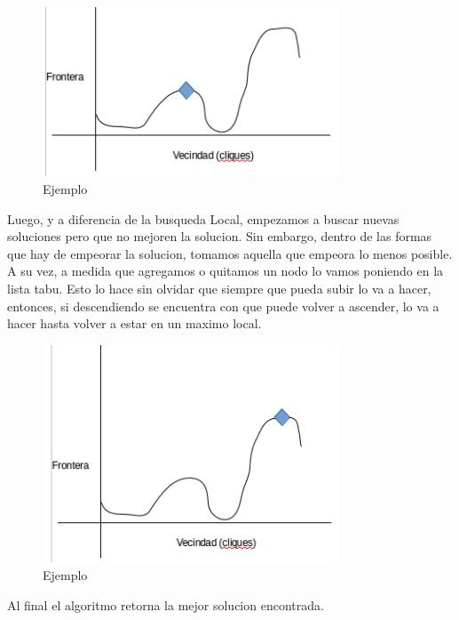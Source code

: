 \begin{figure}[H] %
\begin{center}
\includegraphics[width=250pt]{../imgs/1_tabu.png}
\caption{Ejemplo}
\end{center}
\end{figure}

 Luego, y a diferencia de la busqueda Local, empezamos a buscar nuevas soluciones pero que no mejoren la solucion. Sin embargo, dentro de las formas que hay de empeorar la solucion, tomamos aquella que empeora lo menos posible. A su vez, a medida que agregamos o quitamos un nodo lo vamos poniendo en la lista tabu. Esto lo hace sin olvidar que siempre que pueda subir lo va a hacer, entonces, si descendiendo se encuentra con que puede volver a ascender, lo va a hacer hasta volver a estar en un maximo local. \newline

\begin{figure}[H] %
\begin{center}
\includegraphics[width=250pt]{../imgs/2_tabu.png}
\caption{Ejemplo}
\end{center}
\end{figure}

Al final el algoritmo retorna la mejor solucion encontrada. \newline


